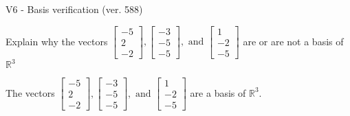 \begin{exercise}
  \begin{exerciseTitle}V6 - Basis verification (ver. 588)\end{exerciseTitle}
  \begin{exerciseStatement}
    Explain why the vectors \(\left[\begin{array}{r}
-5 \\
2 \\
-2
\end{array}\right] , \left[\begin{array}{r}
-3 \\
-5 \\
-5
\end{array}\right] , \text{ and } \left[\begin{array}{r}
1 \\
-2 \\
-5
\end{array}\right]\) are or are not a basis of \(\mathbb{R}^3\)	


  \end{exerciseStatement}
  \begin{exerciseAnswer}
   The vectors \(\left[\begin{array}{r}
-5 \\
2 \\
-2
\end{array}\right] , \left[\begin{array}{r}
-3 \\
-5 \\
-5
\end{array}\right] , \text{ and } \left[\begin{array}{r}
1 \\
-2 \\
-5
\end{array}\right]\) 
  	 are  a basis of \(\mathbb{R}^3\).
  


  \end{exerciseAnswer}
\end{exercise}